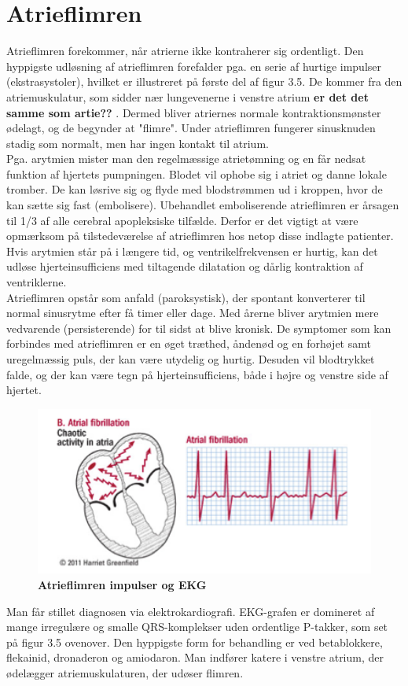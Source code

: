 \section{Atrieflimren}
Atrieflimren forekommer, når atrierne ikke kontraherer sig ordentligt. Den hyppigste udløsning af atrieflimren forefalder pga. en serie af hurtige impulser (ekstrasystoler), hvilket er illustreret på første del af figur 3.5.  De kommer fra den atriemuskulatur, som sidder nær lungevenerne i venstre atrium \textbf{er det det samme som artie??} . Dermed bliver atriernes normale kontraktionsmønster ødelagt, og de begynder at "flimre". Under atrieflimren fungerer sinusknuden stadig som normalt, men har ingen kontakt til atrium.\\
Pga. arytmien mister man den regelmæssige atrietømning og en får nedsat funktion af hjertets pumpningen. Blodet vil ophobe sig i atriet og danne lokale tromber.  De kan løsrive sig og flyde med blodstrømmen ud i kroppen, hvor de kan sætte sig fast (embolisere). Ubehandlet emboliserende atrieflimren er årsagen til 1/3 af alle cerebral apopleksiske tilfælde. Derfor er det vigtigt at være opmærksom på tilstedeværelse af atrieflimren hos netop disse indlagte patienter.\\
Hvis arytmien står på i længere tid, og ventrikelfrekvensen er hurtig, kan det udløse hjerteinsufficiens med tiltagende dilatation og dårlig kontraktion af ventriklerne. \\
Atrieflimren opstår som anfald (paroksystisk), der spontant konverterer til normal sinusrytme efter få timer eller dage. Med årerne bliver arytmien mere vedvarende (persisterende) for til sidst at blive kronisk.  De symptomer som kan forbindes med atrieflimren er en øget træthed, åndenød og en forhøjet samt uregelmæssig puls, der kan være utydelig og hurtig. Desuden vil blodtrykket falde, og der kan være tegn på hjerteinsufficiens, både i højre og venstre side af hjertet. 

\begin{figure}[htb]
	\centering
	\includegraphics[width=1\textwidth]{Figurer/Snip20150412_32}
	\caption{\textbf{Atrieflimren impulser og EKG}\protect\footnotemark}
\end{figure}

Man får stillet diagnosen via elektrokardiografi. EKG-grafen er domineret af mange irregulære og smalle QRS-komplekser uden ordentlige P-takker, som set på figur 3.5 ovenover. Den hyppigste form for behandling er ved betablokkere, flekainid, dronaderon og amiodaron. Man indfører katere i venstre atrium, der ødelægger atriemuskulaturen, der udøser flimren.

  